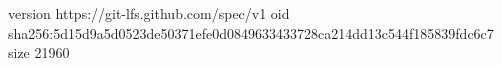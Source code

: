 version https://git-lfs.github.com/spec/v1
oid sha256:5d15d9a5d0523de50371efe0d0849633433728ca214dd13c544f185839fdc6c7
size 21960

